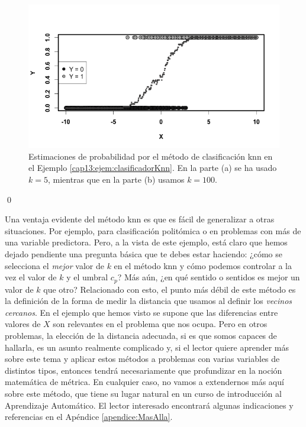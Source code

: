 \begin{ejemplo}
\begin{figure}[tbhp]
\begin{center}
\begin{enColor}
\end{enColor}
\begin{bn} \includegraphics[width=14cm]{../fig/Cap13-ClasificadorKnn02-bn.png}
\end{bn}
\caption{Estimaciones de probabilidad por el método de clasificación
knn en el Ejemplo \ref{cap13:ejem:clasificadorKnn}. En la parte (a) se ha usado $k=5$, mientras que en la parte (b) usamos $k=100$.	}
\label{cap13:fig:ClasificadorKnn}
\end{center}
\end{figure}
\qed	
\end{ejemplo}
	
Una ventaja evidente del método knn es que es fácil de generalizar a otras situaciones. Por ejemplo, para clasificación politómica o en problemas con más de una variable predictora. Pero, a la vista de este ejemplo, está claro que hemos dejado pendiente una pregunta básica que te debes estar haciendo: ¿cómo se selecciona el {\em mejor} valor de $k$ en el método knn y cómo podemos controlar a la vez el valor de $k$ y el umbral $c_p$? Más aún, ¿en qué sentido o sentidos es mejor un valor de $k$ que otro? Relacionado con esto,  el punto más débil de este método es la definición de la forma de medir la distancia que usamos al definir los {\em vecinos cercanos}. En el ejemplo que hemos visto se supone que las diferencias entre valores de $X$ son relevantes en el problema que nos ocupa. Pero en otros problemas, la elección de la distancia adecuada, si es que somos capaces de hallarla, es un asunto realmente complicado y, si el lector quiere aprender más sobre este tema y aplicar estos métodos a problemas con varias variables de distintos tipos, entonces tendrá necesariamente que profundizar en la noción matemática de métrica. En cualquier caso, no vamos a extendernos más aquí sobre este método, que tiene su lugar natural en un curso de introducción al Aprendizaje Automático. El lector interesado encontrará algunas indicaciones y referencias en el Apéndice \ref{apendice:MasAlla}.

